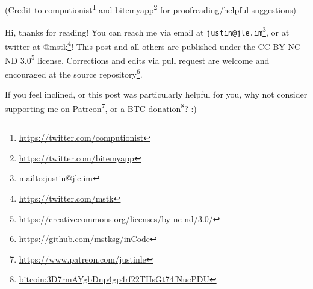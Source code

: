 \documentclass[]{article}
\renewcommand{\href}[2]{#2\footnote{\url{#1}}}
\begin{document}
(Credit to \href{https://twitter.com/computionist}{computionist} and
\href{https://twitter.com/bitemyapp}{bitemyapp} for proofreading/helpful
suggestions)

Hi, thanks for reading! You can reach me via email at
\href{mailto:justin@jle.im}{\nolinkurl{justin@jle.im}}, or at twitter at
\href{https://twitter.com/mstk}{@mstk}! This post and all others are published
under the \href{https://creativecommons.org/licenses/by-nc-nd/3.0/}{CC-BY-NC-ND
3.0} license. Corrections and edits via pull request are welcome and encouraged
at \href{https://github.com/mstksg/inCode}{the source repository}.

If you feel inclined, or this post was particularly helpful for you, why not
consider \href{https://www.patreon.com/justinle}{supporting me on Patreon}, or a
\href{bitcoin:3D7rmAYgbDnp4gp4rf22THsGt74fNucPDU}{BTC donation}? :)
\end{document}
